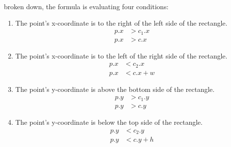 \documentclass[10pt,a4paper]{article}
\begin{document}
broken down, the formula is evaluating four conditions:
\begin{multicols}{2}
    \begin{enumerate}
        \item The point's x-coordinate is to the right of the left side of the rectangle.
              \begin{equation*}
                  \begin{aligned}
                      p.x & > c_1.x \\
                      p.x & > c.x
                  \end{aligned}
              \end{equation*}

        \item The point's x-coordinate is to the left of the right side of the rectangle.
              \begin{equation*}
                  \begin{aligned}
                      p.x & < c_2.x   \\
                      p.x & < c.x + w
                  \end{aligned}
              \end{equation*}

        \item The point's y-coordinate is above the bottom side of the rectangle.
              \begin{equation*}
                  \begin{aligned}
                      p.y & > c_1.y \\
                      p.y & > c.y
                  \end{aligned}
              \end{equation*}

        \item The point's y-coordinate is below the top side of the rectangle.
              \begin{equation*}
                  \begin{aligned}
                      p.y & < c_2.y   \\
                      p.y & < c.y + h
                  \end{aligned}
              \end{equation*}
    \end{enumerate}
\end{multicols}
\newpage
\end{document}

